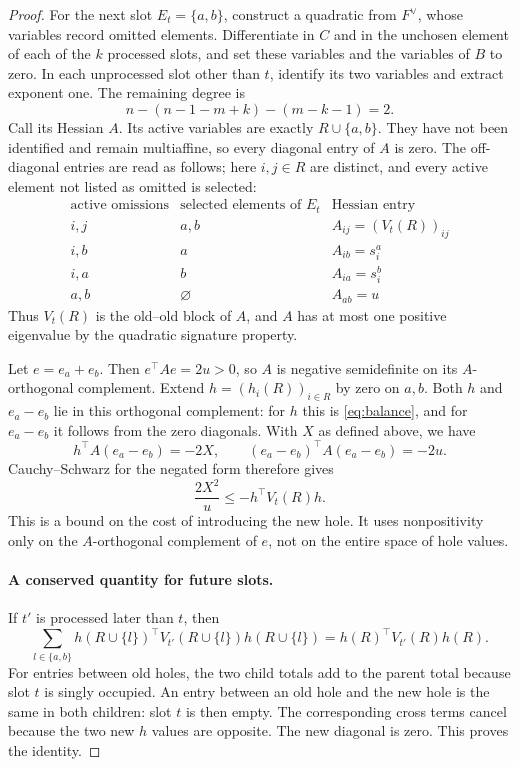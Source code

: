 \documentclass[11pt]{article}
\theoremstyle{definition}
\begin{document}
\begin{proof}
For the next slot $E_t=\{a,b\}$, construct a quadratic from $F^\vee$,
whose variables record omitted elements.  Differentiate in $C$ and in
the unchosen element of each of the $k$ processed slots, and set these
variables and the variables of $B$ to zero.  In each unprocessed slot
other than $t$, identify its two variables and extract exponent one.
The remaining degree is
\[
 n-(n-1-m+k)-(m-k-1)=2.
\]
Call its Hessian $A$.  Its active variables are exactly $R\cup\{a,b\}$.
They have not been identified and remain multiaffine, so every diagonal
entry of $A$ is zero.  The off-diagonal entries are read as follows;
here $i,j\in R$ are distinct, and every active element not listed as
omitted is selected:
\begin{equation}\label{eq:transportHessian}
 \begin{array}{c|c|c}
 \text{active omissions}&\text{selected elements of }E_t&\text{Hessian entry}\\ \hline
 i,j&a,b&A_{ij}=(V_t(R))_{ij}\\
 i,b&a&A_{ib}=s_i^a\\
 i,a&b&A_{ia}=s_i^b\\
 a,b&\varnothing&A_{ab}=u
 \end{array}
\end{equation}
Thus $V_t(R)$ is the old--old block of $A$, and $A$ has at most one
positive eigenvalue by the quadratic signature property.

Let $e=e_a+e_b$.  Then $e^\top Ae=2u>0$, so $A$ is negative semidefinite
on its $A$-orthogonal complement.  Extend $h=(h_i(R))_{i\in R}$ by zero
on $a,b$.  Both $h$ and $e_a-e_b$ lie in this orthogonal complement:
for $h$ this is \eqref{eq:balance}, and for $e_a-e_b$ it follows from
the zero diagonals.  With $X$ as defined above, we have
\[
 h^\top A(e_a-e_b)=-2X,\qquad
 (e_a-e_b)^\top A(e_a-e_b)=-2u.
\]
Cauchy--Schwarz for the negated form therefore gives
\begin{equation}\label{eq:splitbound}
 \frac{2X^2}{u}\le-h^\top V_t(R)h.
\end{equation}
This is a bound on the cost of introducing the new hole.  It uses
nonpositivity only on the $A$-orthogonal complement of $e$, not on the
entire space of hole values.

\paragraph{A conserved quantity for future slots.}
If $t'$ is processed later than $t$, then
\begin{equation}\label{eq:futureconservation}
 \sum_{l\in\{a,b\}}
 h(R\cup\{l\})^\top V_{t'}(R\cup\{l\})h(R\cup\{l\})
 =h(R)^\top V_{t'}(R)h(R).
\end{equation}
For entries between old holes, the two child totals add to the parent
total because slot $t$ is singly occupied.  An entry between an old
hole and the new hole is the same in both children: slot $t$ is then
empty.  The corresponding cross terms cancel because the two new $h$
values are opposite.  The new diagonal is zero.  This proves the identity.


\end{proof}
\end{document}
